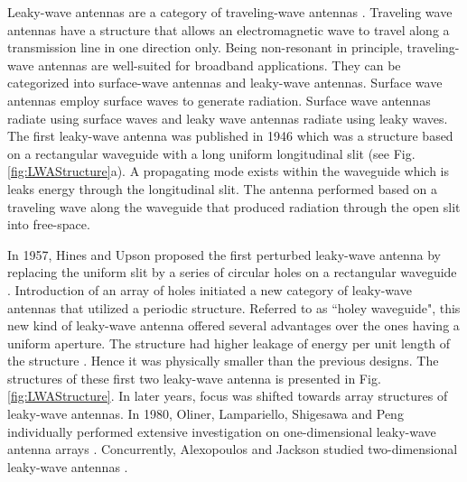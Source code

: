 Leaky-wave antennas are a category of traveling-wave antennas \cite{Collin1985}. Traveling wave antennas have a structure that allows an electromagnetic wave to travel along a transmission line in one direction only. Being non-resonant in principle, traveling-wave antennas are well-suited for broadband applications. They can be categorized into surface-wave antennas and leaky-wave antennas. Surface wave antennas employ surface waves to generate radiation. Surface wave antennas radiate using surface waves and leaky wave antennas radiate using leaky waves. The first leaky-wave antenna was published in 1946 \cite{hansen1946} which was a structure based on a rectangular waveguide with a long uniform longitudinal slit (see Fig. \ref{fig:LWAStructure}a). A propagating mode exists within the waveguide which is leaks energy through the longitudinal slit. The antenna performed based on a traveling wave along the waveguide that produced radiation through the open slit into free-space. %

In 1957, Hines and Upson proposed the first perturbed leaky-wave antenna by replacing the uniform slit by a series of circular holes on a rectangular waveguide \cite{Hines1957}. Introduction of an array of holes initiated a new category of leaky-wave antennas that utilized a periodic structure. Referred to as ``holey waveguide", this new kind of leaky-wave antenna offered several advantages over the ones having a uniform aperture. The structure had higher leakage of energy per unit length of the structure \cite{Jackson2008}. Hence it was physically smaller than the previous designs. The structures of these first two leaky-wave antenna is presented in Fig. \ref{fig:LWAStructure}. In later years, focus was shifted towards array structures of leaky-wave antennas. In 1980, Oliner, Lampariello, Shigesawa and Peng individually performed extensive investigation on one-dimensional leaky-wave antenna arrays \cite{Oliner1988}. Concurrently, Alexopoulos and Jackson studied two-dimensional leaky-wave antennas \cite{Alexopoulos1984, Jackson1985}.

